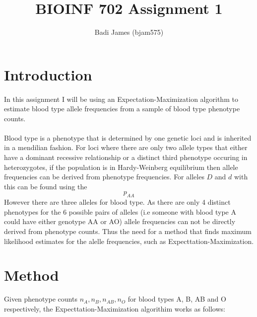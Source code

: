 \documentclass{article}
\title{BIOINF 702 Assignment 1}
\author{Badi James (bjam575)}
\begin{document}
	
	\maketitle
	
	\section{Introduction}
	
	\paragraph{}In this assignment I will be using an Expectation-Maximization algorithm to estimate blood type allele frequencies from a sample of blood type phenotype counts. 
	\paragraph{}Blood type is a phenotype that is determined by one genetic loci and is inherited in a mendilian fashion. For loci where there are only two allele types that either have a dominant recessive relationship or a distinct third phenotype occuring in heterozygotes, if the population is in Hardy-Weinberg equilibrium then allele frequencies can be derived from phenotype frequencies.
	For alleles $D$ and $d$ with  this can be found using the 
	\[p_{AA}\] However there are three alleles for blood type. As there are only 4 distinct phenotypes for the 6 possible pairs of alleles (i.e someone with blood type A could have either genotype AA or AO) allele frequencies can not be directly derived from phenotype counts. Thus the need for a method that finds maximum likelihood estimates for the alelle frequencies, such as Expecttation-Maximization.
	
	\section{Method}
	
	Given phenotype counts $n_A, n_B, n_{AB}, n_O$ for blood types A, B, AB and O respectively, the Expecttation-Maximization algorithim works as follows:
	
\end{document}
